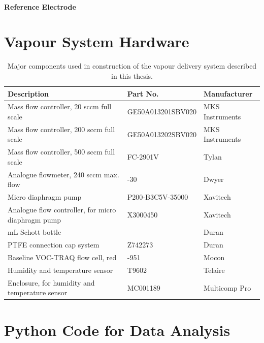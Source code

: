 \documentclass[
  a4paper,
]{scrbook}
\begin{document}
\hypertarget{reference-electrode}{%
\subsubsection*{Reference Electrode}\label{reference-electrode}}

\cleardoublepage
{}
{}
\appendix

\hypertarget{sec-vapour-sensor-components}{%
\chapter{Vapour System Hardware}\label{sec-vapour-sensor-components}}

\hypertarget{tbl-vapour-sensor-components}{}
\begin{longtable}[t]{>{\raggedright\arraybackslash}p{5.5cm}>{\raggedright\arraybackslash}p{4.5cm}>{\raggedright\arraybackslash}p{3.75cm}}
\caption{\label{tbl-vapour-sensor-components}Major components used in construction of the vapour delivery system
described in this thesis. }\tabularnewline

\toprule
Description & Part No. & Manufacturer\\
\midrule
Mass flow controller, 20 sccm full scale & GE50A013201SBV020 & MKS Instruments\\
Mass flow controller, 200 sccm full scale & GE50A013202SBV020 & MKS Instruments\\
Mass flow controller, 500 sccm full scale & FC-2901V & Tylan\\
Analogue flowmeter, 240 sccm max. flow & 116261-30 & Dwyer\\
Micro diaphragm pump & P200-B3C5V-35000 & Xavitech\\
\addlinespace
Analogue flow controller, for micro diaphragm pump & X3000450 & Xavitech\\
10 mL Schott bottle & 218010802 & Duran\\
PTFE connection cap system & Z742273 & Duran\\
Baseline VOC-TRAQ flow cell, red & 043-951 & Mocon\\
Humidity and temperature sensor & T9602 & Telaire\\
\addlinespace
Enclosure, for humidity and temperature sensor & MC001189 & Multicomp Pro\\
\bottomrule
\end{longtable}

\hypertarget{sec-python}{%
\chapter{Python Code for Data Analysis}\label{sec-python}}
\end{document}
